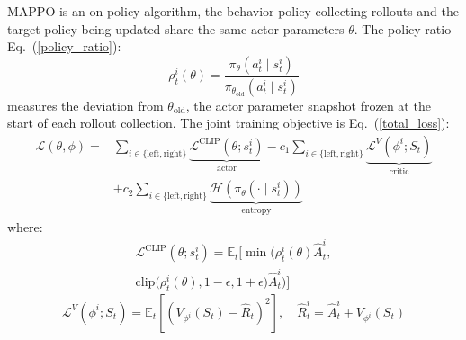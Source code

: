 \documentclass[a4paper,fleqn]{cas-dc}
\begin{document}
MAPPO is an on-policy algorithm, the behavior policy collecting rollouts and the target policy being updated share the same actor parameters $\theta$. The policy ratio Eq.~(\ref{policy_ratio}):
\begin{equation}
\rho_t^i(\theta) =
\frac{\pi_{\theta}(a_t^i \mid s_t^i)}
{\pi_{\theta_{\text{old}}}(a_t^i \mid s_t^i)}
\label{policy_ratio}
\end{equation}
measures the deviation from $\theta_{\text{old}}$, the actor parameter snapshot frozen at the start of each rollout collection. The joint training objective is Eq.~(\ref{total_loss}):
\begin{equation}
\begin{aligned}
\mathcal{L}(\theta, \phi) =
& \sum_{i \in \{\text{left}, \text{right}\}}
\underbrace{\mathcal{L}^{\text{CLIP}}\left(\theta; s_t^i\right)}_{\text{actor}}
- c_1\sum_{i \in \{\text{left}, \text{right}\}}\underbrace{\mathcal{L}^{V}\left(\phi^{i}; S_t\right)}_{\text{critic}} \\
& + c_2 \sum_{i \in \{\text{left}, \text{right}\}}
\underbrace{\mathcal{H}\left(\pi_{\theta}(\cdot \mid s_t^i)\right)}_{\text{entropy}}
\end{aligned}
\label{total_loss}
\end{equation}
\noindent where:
\begin{equation}
\begin{aligned}
\mathcal{L}^{\text{CLIP}}(\theta; s_t^i) =
\mathbb{E}_t \Big[
\min \Big(
\rho_t^i(\theta)\hat{A}_t^i, \\
\mathrm{clip}\big(\rho_t^i(\theta), 1-\epsilon, 1+\epsilon\big)\hat{A}_t^i
\Big)
\Big]
\end{aligned}
\label{actor_loss}
\end{equation}
\begin{equation}
\mathcal{L}^{V}(\phi^{i}; S_t) =
\mathbb{E}_t \left[
\left( V_{\phi^{i}}(S_t) - \hat{R}_t \right)^2
\right],
\quad
\hat{R}^{i}_t = \hat{A}_t^i + V_{\phi^{i}}(S_t)
\label{critic_loss}
\end{equation}
\end{document}
